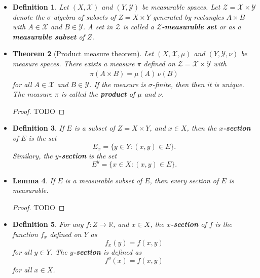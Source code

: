 \documentclass[10pt]{article}
\newtheorem{lemma}{Lemma}
\newtheorem{theorem}[lemma]{Theorem}
\newtheorem{definition}[lemma]{Definition}
\newcommand{\mcal}[1]{\mathcal{#1}}
\newcommand{\Real}{\mathbb{R}}
\begin{document}
\begin{itemize}
  \item \begin{definition}
    Let $(X,\mcal{X})$ and $(Y,\mcal{Y})$ be measurable spaces. Let $\mcal{Z} = \mcal{X} \times \mcal{Y}$ denote the $\sigma$-algebra of subsets of $Z = X \times Y$  generated by rectangles $A \times B$ with $A \in \mcal{X}$ and $B \in \mcal{Y}$. A set in $\mcal{Z}$ is called a {\bf $\mcal{Z}$-measurable set} or as a {\bf measurable subset} of $Z$.
  \end{definition}

  \item \begin{theorem}[Product measure theorem]
    Let $(X, \mcal{X}, \mu)$ and $(Y, \mcal{Y}, \nu)$ be measure spaces. There exists a measure $\pi$ defined on $\mcal{Z} = \mcal{X} \times \mcal{Y}$ with
    \begin{align*}
      \pi(A \times B) = \mu(A)\, \nu(B)
    \end{align*}
    for all $A \in \mcal{X}$ and $B \in \mcal{Y}$. If the measure is $\sigma$-finite, then then it is unique. The measure $\pi$ is called the {\bf product} of $\mu$ and $\nu$.
  \end{theorem}

  \begin{proof}
    TODO
  \end{proof}

  \item \begin{definition} If $E$ is a subset of $Z = X \times Y$, and $x \in X$, then the {\bf $x$-section} of $E$ is the set $$E_x = \{y \in Y :  (x,y) \in E \}.$$ Similary, the {\bf $y$-section} is the set $$E^y = \{ x \in X : (x,y) \in E \}.$$ 
  \end{definition}
  
  \item \begin{lemma}
    If $E$ is a measurable subset of $E$, then every section of $E$ is measurable. 
  \end{lemma}

  \begin{proof}
    TODO
  \end{proof}

  \item \begin{definition}
    For any $f: Z \rightarrow \overline{\Real}$, and $x \in X$, the {\bf $x$-section} of $f$ is the function $f_x$ defined on $Y$ as $$f_x(y) = f(x,y)$$ for all $y \in Y$. The {\bf $y$-section} is defined as $$f^y(x) = f(x,y)$$ for all $x \in X$.
  \end{definition}


\end{itemize}
\end{document}

